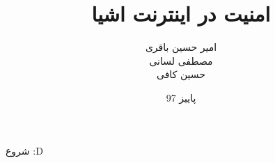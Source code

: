 \documentclass[conference]{IEEEtran}
\title{امنیت در اینترنت اشیا}
\author{
امیر حسین باقری\\
مصطفی لسانی\\
حسین کافی
}
\date{پاییز 97}
\begin{document}
شروع :D
\end{document}
